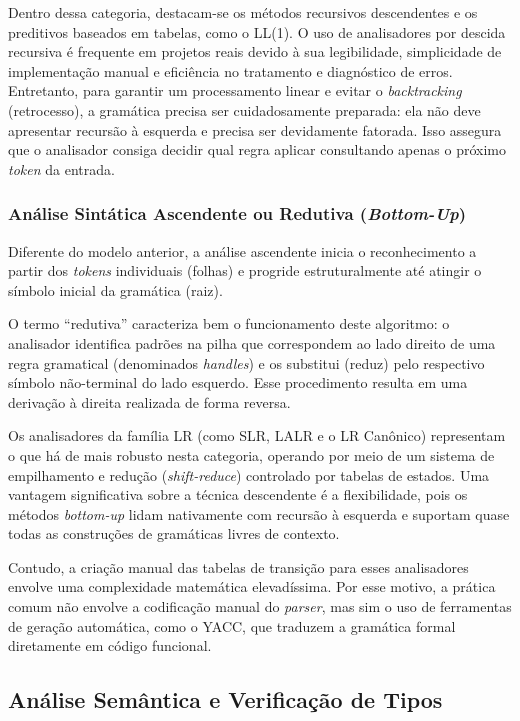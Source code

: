Dentro dessa categoria, destacam-se os métodos recursivos descendentes e os preditivos baseados em tabelas, como o LL(1). O uso de analisadores por descida recursiva é frequente em projetos reais devido à sua legibilidade, simplicidade de implementação manual e eficiência no tratamento e diagnóstico de erros. Entretanto, para garantir um processamento linear e evitar o \textit{backtracking} (retrocesso), a gramática precisa ser cuidadosamente preparada: ela não deve apresentar recursão à esquerda e precisa ser devidamente fatorada. Isso assegura que o analisador consiga decidir qual regra aplicar consultando apenas o próximo \textit{token} da entrada.

\subsubsection*{Análise Sintática Ascendente ou Redutiva (\textit{Bottom-Up})}
Diferente do modelo anterior, a análise ascendente inicia o reconhecimento a partir dos \textit{tokens} individuais (folhas) e progride estruturalmente até atingir o símbolo inicial da gramática (raiz). 

O termo ``redutiva'' caracteriza bem o funcionamento deste algoritmo: o analisador identifica padrões na pilha que correspondem ao lado direito de uma regra gramatical (denominados \textit{handles}) e os substitui (reduz) pelo respectivo símbolo não-terminal do lado esquerdo. Esse procedimento resulta em uma derivação à direita realizada de forma reversa.

Os analisadores da família LR (como SLR, LALR e o LR Canônico) representam o que há de mais robusto nesta categoria, operando por meio de um sistema de empilhamento e redução (\textit{shift-reduce}) controlado por tabelas de estados. Uma vantagem significativa sobre a técnica descendente é a flexibilidade, pois os métodos \textit{bottom-up} lidam nativamente com recursão à esquerda e suportam quase todas as construções de gramáticas livres de contexto. 

Contudo, a criação manual das tabelas de transição para esses analisadores envolve uma complexidade matemática elevadíssima. Por esse motivo, a prática comum não envolve a codificação manual do \textit{parser}, mas sim o uso de ferramentas de geração automática, como o YACC, que traduzem a gramática formal diretamente em código funcional.

\subsection{Análise Semântica e Verificação de Tipos}

